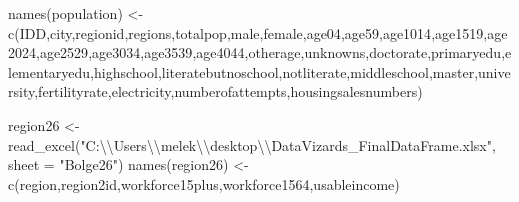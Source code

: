 \documentclass[
  11pt,
  a4paper,
  DIV=11,
  numbers=noendperiod]{scrartcl}
\newenvironment{Shaded}{\begin{snugshade}}{\end{snugshade}}
\newcommand{\AttributeTok}[1]{\textcolor[rgb]{0.40,0.45,0.13}{#1}}
\newcommand{\FunctionTok}[1]{\textcolor[rgb]{0.28,0.35,0.67}{#1}}
\newcommand{\NormalTok}[1]{\textcolor[rgb]{0.00,0.23,0.31}{#1}}
\newcommand{\OtherTok}[1]{\textcolor[rgb]{0.00,0.23,0.31}{#1}}
\newcommand{\SpecialCharTok}[1]{\textcolor[rgb]{0.37,0.37,0.37}{#1}}
\newcommand{\StringTok}[1]{\textcolor[rgb]{0.13,0.47,0.30}{#1}}
\begin{document}
\begin{Shaded}
\begin{Highlighting}[]
\FunctionTok{names}\NormalTok{(population) }\OtherTok{\textless{}{-}} \FunctionTok{c}\NormalTok{(}\StringTok{\textquotesingle{}IDD\textquotesingle{}}\NormalTok{,}\StringTok{\textquotesingle{}city\textquotesingle{}}\NormalTok{,}\StringTok{\textquotesingle{}regionid\textquotesingle{}}\NormalTok{,}\StringTok{\textquotesingle{}regions\textquotesingle{}}\NormalTok{,}\StringTok{\textquotesingle{}totalpop\textquotesingle{}}\NormalTok{,}\StringTok{\textquotesingle{}male\textquotesingle{}}\NormalTok{,}\StringTok{\textquotesingle{}female\textquotesingle{}}\NormalTok{,}\StringTok{\textquotesingle{}age04\textquotesingle{}}\NormalTok{,}\StringTok{\textquotesingle{}age59\textquotesingle{}}\NormalTok{,}\StringTok{\textquotesingle{}age1014\textquotesingle{}}\NormalTok{,}\StringTok{\textquotesingle{}age1519\textquotesingle{}}\NormalTok{,}\StringTok{\textquotesingle{}age2024\textquotesingle{}}\NormalTok{,}\StringTok{\textquotesingle{}age2529\textquotesingle{}}\NormalTok{,}\StringTok{\textquotesingle{}age3034\textquotesingle{}}\NormalTok{,}\StringTok{\textquotesingle{}age3539\textquotesingle{}}\NormalTok{,}\StringTok{\textquotesingle{}age4044\textquotesingle{}}\NormalTok{,}\StringTok{\textquotesingle{}otherage\textquotesingle{}}\NormalTok{,}\StringTok{\textquotesingle{}unknowns\textquotesingle{}}\NormalTok{,}\StringTok{\textquotesingle{}doctorate\textquotesingle{}}\NormalTok{,}\StringTok{\textquotesingle{}primaryedu\textquotesingle{}}\NormalTok{,}\StringTok{\textquotesingle{}elementaryedu\textquotesingle{}}\NormalTok{,}\StringTok{\textquotesingle{}highschool\textquotesingle{}}\NormalTok{,}\StringTok{\textquotesingle{}literatebutnoschool\textquotesingle{}}\NormalTok{,}\StringTok{\textquotesingle{}notliterate\textquotesingle{}}\NormalTok{,}\StringTok{\textquotesingle{}middleschool\textquotesingle{}}\NormalTok{,}\StringTok{\textquotesingle{}master\textquotesingle{}}\NormalTok{,}\StringTok{\textquotesingle{}university\textquotesingle{}}\NormalTok{,}\StringTok{\textquotesingle{}fertilityrate\textquotesingle{}}\NormalTok{,}\StringTok{\textquotesingle{}electricity\textquotesingle{}}\NormalTok{,}\StringTok{\textquotesingle{}numberofattempts\textquotesingle{}}\NormalTok{,}\StringTok{\textquotesingle{}housingsalesnumbers\textquotesingle{}}\NormalTok{)}

\NormalTok{region26 }\OtherTok{\textless{}{-}} \FunctionTok{read\_excel}\NormalTok{(}\StringTok{"C:}\SpecialCharTok{\textbackslash{}\textbackslash{}}\StringTok{Users}\SpecialCharTok{\textbackslash{}\textbackslash{}}\StringTok{melek}\SpecialCharTok{\textbackslash{}\textbackslash{}}\StringTok{desktop}\SpecialCharTok{\textbackslash{}\textbackslash{}}\StringTok{DataVizards\_FinalDataFrame.xlsx"}\NormalTok{, }\AttributeTok{sheet =} \StringTok{"Bolge26"}\NormalTok{)}
\FunctionTok{names}\NormalTok{(region26) }\OtherTok{\textless{}{-}} \FunctionTok{c}\NormalTok{(}\StringTok{\textquotesingle{}region\textquotesingle{}}\NormalTok{,}\StringTok{\textquotesingle{}region2id\textquotesingle{}}\NormalTok{,}\StringTok{\textquotesingle{}workforce15plus\textquotesingle{}}\NormalTok{,}\StringTok{\textquotesingle{}workforce1564\textquotesingle{}}\NormalTok{,}\StringTok{\textquotesingle{}usableincome\textquotesingle{}}\NormalTok{)}


\end{Highlighting}
\end{Shaded}
\end{document}
